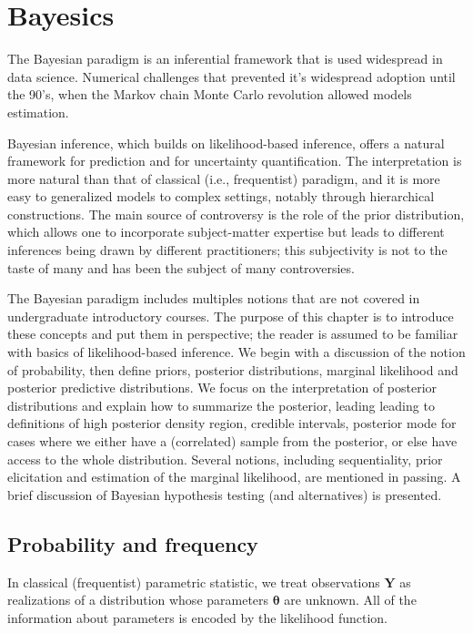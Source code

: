 \documentclass[
  11pt,
  letterpaper,
]{scrbook}
\theoremstyle{definition}
\theoremstyle{plain}
\theoremstyle{plain}
\theoremstyle{definition}
\theoremstyle{definition}
\theoremstyle{remark}
\begin{document}

\chapter{Bayesics}\label{bayesics}

The Bayesian paradigm is an inferential framework that is used
widespread in data science. Numerical challenges that prevented it's
widespread adoption until the 90's, when the Markov chain Monte Carlo
revolution allowed models estimation.

Bayesian inference, which builds on likelihood-based inference, offers a
natural framework for prediction and for uncertainty quantification. The
interpretation is more natural than that of classical (i.e.,
frequentist) paradigm, and it is more easy to generalized models to
complex settings, notably through hierarchical constructions. The main
source of controversy is the role of the prior distribution, which
allows one to incorporate subject-matter expertise but leads to
different inferences being drawn by different practitioners; this
subjectivity is not to the taste of many and has been the subject of
many controversies.

The Bayesian paradigm includes multiples notions that are not covered in
undergraduate introductory courses. The purpose of this chapter is to
introduce these concepts and put them in perspective; the reader is
assumed to be familiar with basics of likelihood-based inference. We
begin with a discussion of the notion of probability, then define
priors, posterior distributions, marginal likelihood and posterior
predictive distributions. We focus on the interpretation of posterior
distributions and explain how to summarize the posterior, leading
leading to definitions of high posterior density region, credible
intervals, posterior mode for cases where we either have a (correlated)
sample from the posterior, or else have access to the whole
distribution. Several notions, including sequentiality, prior
elicitation and estimation of the marginal likelihood, are mentioned in
passing. A brief discussion of Bayesian hypothesis testing (and
alternatives) is presented.

\section{Probability and frequency}\label{probability-and-frequency}

In classical (frequentist) parametric statistic, we treat observations
\(\boldsymbol{Y}\) as realizations of a distribution whose parameters
\(\boldsymbol{\theta}\) are unknown. All of the information about
parameters is encoded by the likelihood function.
\end{document}
